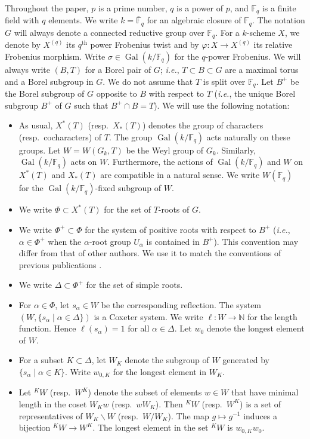 \documentclass[11pt]{amsart}
\numberwithin{equation}{section}
\theoremstyle{definition}
\theoremstyle{remark}
\newcommand{\FF}{\mathbb{F}}
\newcommand{\NN}{\mathbb{N}}
\DeclareMathOperator{\Gal}{Gal}
\newcommand{\supth}[1]{\ensuremath{#1^{\mathrm{th}}}}
\begin{document}
Throughout the paper, $p$ is a prime number, $q$ is a power of $p$, and $\FF_q$ is a finite field with $q$ elements. We write $k=\overline{\FF}_q$ for an algebraic closure of $\FF_q$. The notation $G$ will always denote a connected reductive group over $\FF_q$. For a $k$-scheme $X$, we denote by $X^{(q)}$ its $\supth{q}$ power Frobenius twist and by $\varphi \colon X\to X^{(q)}$ its relative Frobenius morphism. Write $\sigma \in \Gal(k/\FF_q)$ for the $q$-power Frobenius. We will always write $(B,T)$ for a Borel pair of $G$; \textit{i.e.}, $T \subset B \subset G$ are 
a maximal torus and a Borel subgroup in $G$. We do not assume that $T$ is split over $\FF_q$. Let $B^+$ be the Borel subgroup of $G$  opposite to $B$ with respect to $T$ (\textit{i.e.}, the unique Borel subgroup $B^+$ of $G$ such that $B^+\cap B=T$). We will use the following notation: 
\begin{itemize}
\item As usual, $X^*(T)$ (resp.~$X_*(T)$) denotes the group of characters (resp.~cocharacters) of $T$. The group $\Gal(k/\FF_q)$ acts naturally on these groups. Let $W=W(G_k,T)$ be the Weyl group of $G_k$. Similarly, $\Gal(k/\FF_q)$ acts on $W$. Furthermore, the actions of $\Gal(k/\FF_q)$ and $W$ on $X^*(T)$ and $X_*(T)$ are compatible in a natural sense. We write $W(\FF_q)$ for the $\Gal(k/\FF_q)$-fixed subgroup of $W$. 
\item We write $\Phi\subset X^*(T)$ for the set of $T$-roots of $G$.
\item We write $\Phi^+\subset \Phi$ for the system of positive roots with respect to $B^+$ (\textit{i.e.}, $\alpha \in \Phi^+$ when the $\alpha$-root group $U_{\alpha}$ is contained in $B^+$). This convention may differ from that of other authors. We use it to match the conventions of previous publications \cite{Goldring-Koskivirta-Strata-Hasse,Koskivirta-automforms-GZip}.
\item We write $\Delta\subset \Phi^+$ for the set of simple roots. 
\item For $\alpha \in \Phi$, let $s_\alpha \in W$ be the corresponding reflection. The system $(W,\{s_\alpha \mid \alpha \in \Delta\})$ is a Coxeter system. 
We write $\ell  \colon W\to \NN$ for the length function. Hence $\ell(s_\alpha)=1$ for all $\alpha\in \Delta$. Let $w_0$ denote the longest element of $W$.
\item For a subset $K\subset \Delta$, let $W_K$ denote the subgroup of $W$ generated by $\{s_\alpha \mid \alpha \in K\}$. Write $w_{0,K}$ for the longest element in $W_K$.
\item Let ${}^KW$ (resp.~$W^K$) denote the subset of elements $w\in W$ that have minimal length in the coset $W_K w$ (resp.~$wW_K$). Then ${}^K W$ (resp.\ $W^K$) is a set of representatives of $W_K\backslash W$ (resp.\ $W/W_K$). The map $g\mapsto g^{-1}$ induces a bijection ${}^K W\to W^K$. The longest element in the set ${}^K W$ is $w_{0,K} w_0$.

\end{itemize}
\end{document}
